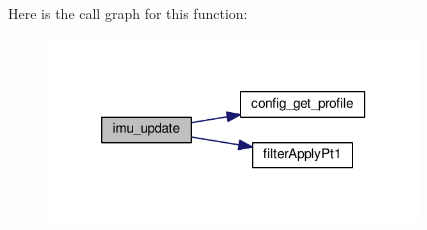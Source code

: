 Here is the call graph for this function\+:\nopagebreak
\begin{figure}[H]
\begin{center}
\leavevmode
\includegraphics[width=278pt]{group__IMU_gaea89e9b064c1540b404b159a6299d3e1_cgraph}
\end{center}
\end{figure}


